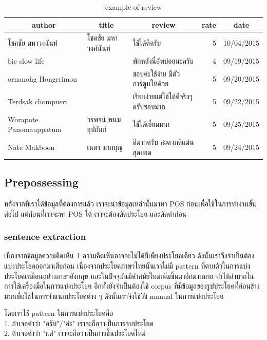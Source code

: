 \begin{table}[h]
	\caption{example of review}
	\label{table:review}
	\centering
	\begin{tabular}{|l|l|l|r|c|}
		\hline
		\multicolumn{1}{|c|}{author} &
		\multicolumn{1}{|c|}{title}&
		\multicolumn{1}{|c|}{review}&
		\multicolumn{1}{|c|}{rate}&
		\multicolumn{1}{|c|}{date}\\
		\hline
		โชคชัย มหาวงนันท์ & โชคชัย มหาวงศ์นันท์ & ใช้ได้ดีครับ & 5&10/04/2015\\
		\hline
		bie slow life &  & พักหลังนี่อัพบ่อยนะครับ & 4&09/19/2015\\
		\hline
		ornanohg Hongrrimon &  & ชอบค่ะใช้ง่าย มีตัวการ์ตูนให้ด้วย & 5&09/20/2015\\
		\hline
		Terdsak chompusri &  & เรียบง่ายแต่ใช้ได้ดีจริงๆครับชอบมาก & 5&09/22/2015\\
		\hline
		Worapote Panomauppatum & วรพจน์  พนมอุปถัมภ์ & ใช้ได้เยื่ยมมาก & 5&09/25/2015\\
		\hline
		Nate Makboon & เนตร มากบุญ & ดีมากครับ สะดวกดีแม่นสุดยอด & 5&09/24/2015\\
		\hline
	\end{tabular}
\end{table}

\subsection{Prepossessing}
หลังจากที่เราได้ข้อมูลที่ต้องการแล้ว เราจะนำข้อมูลเหล่านั้นมาหา POS ก่อนเพื่อใช้ในการทำงานขั้นต่อไป แต่ก่อนที่เราจะหา POS ได้ เราจะต้องตัดประโยค และตัดคำก่อน
\subsubsection{sentence extraction}
เนื่องจากข้อมูลความคิดเห็น 1 ความคิดเห็นอาจจะไม่ได้มีเพียงประโยคเดียว ดังนั้นเราจึงจำเป็นต้องแบ่งประโยคออกมาเสียก่อน เนื่องจากประโยคภาษาไทยนั้นเราไม่มี pattern ที่ตายตัวในการแบ่งประโยคเหมือนอย่างภาษาอังกฤษ และในปัจจุบันมีคำสมัยใหม่เพิ่มขึ้นมาอีกมากมาย ทำให้ลำบากในการใช้เครื่องมือในการแบ่งประโยค อีกทั้งยังจำเป็นต้องใช้ corpus ที่มีข้อมูลของรูปประโยคที่ค่อนข้างมากเพื่อใช้ในการจำแนกประโยคต่าง ๆ ดังนั้นเราจึงใช้วิธี manual ในการแบ่งประโยค 

โดยเราใช้ pattern ในการแบ่งประโยคคือ\\ 
1. ถ้าเจอคำว่า "ครับ"/"ค่ะ" เราจะถือว่าเป็นการจบประโยค\\
2. ถ้าเจอคำว่า "แต่" เราจะถือว่าเป็นการขึ้นประโยคใหม่
